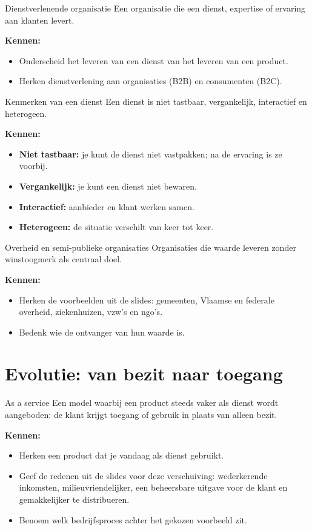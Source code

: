 \documentclass[11pt,a4paper]{article}
\newcommand{\kennen}{\par\smallskip\textbf{Kennen:}}
\begin{document}
\begin{definition}{Dienstverlenende organisatie}
Een organisatie die een dienst, expertise of ervaring aan klanten levert.
\kennen
\begin{itemize}
  \item Onderscheid het leveren van een dienst van het leveren van een product.
  \item Herken dienstverlening aan organisaties (B2B) en consumenten (B2C).
\end{itemize}
\end{definition}

\begin{definition}{Kenmerken van een dienst}
Een dienst is niet tastbaar, vergankelijk, interactief en heterogeen.
\kennen
\begin{itemize}
  \item \textbf{Niet tastbaar:} je kunt de dienst niet vastpakken; na de ervaring is ze voorbij.
  \item \textbf{Vergankelijk:} je kunt een dienst niet bewaren.
  \item \textbf{Interactief:} aanbieder en klant werken samen.
  \item \textbf{Heterogeen:} de situatie verschilt van keer tot keer.
\end{itemize}
\end{definition}

\begin{definition}{Overheid en semi-publieke organisaties}
Organisaties die waarde leveren zonder winstoogmerk als centraal doel.
\kennen
\begin{itemize}
  \item Herken de voorbeelden uit de slides: gemeenten, Vlaamse en federale overheid,
        ziekenhuizen, vzw's en ngo's.
  \item Bedenk wie de ontvanger van hun waarde is.
\end{itemize}
\end{definition}

\section{Evolutie: van bezit naar toegang}

\begin{definition}{As a service}
Een model waarbij een product steeds vaker als dienst wordt aangeboden: de
klant krijgt toegang of gebruik in plaats van alleen bezit.
\kennen
\begin{itemize}
  \item Herken een product dat je vandaag als dienst gebruikt.
  \item Geef de redenen uit de slides voor deze verschuiving:
        wederkerende inkomsten, milieuvriendelijker, een beheersbare uitgave
        voor de klant en gemakkelijker te distribueren.
  \item Benoem welk bedrijfsproces achter het gekozen voorbeeld zit.
\end{itemize}
\end{definition}
\end{document}
